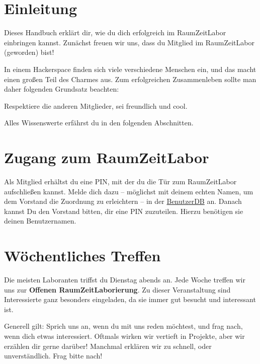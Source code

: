 \documentclass[12pt, DIV16, a4paper]{scrartcl}
\begin{document}
\pagestyle{fancy}
\newcommand{\np}{\bigskip\noindent}
\setlength{\parindent}{0pt}

\section*{Einleitung}

Dieses Handbuch erklärt dir, wie du dich erfolgreich im RaumZeitLabor
einbringen kannst. Zunächst freuen wir uns, dass du Mitglied im RaumZeitLabor
(geworden) bist!
\np

In einem Hackerspace finden sich viele verschiedene Menschen ein, und das macht
einen großen Teil des Charmes aus. Zum erfolgreichen Zusammenleben sollte man
daher folgenden Grundsatz beachten:

\begin{center}
	Respektiere die anderen Mitglieder, sei freundlich und cool.
\end{center}

Alles Wissenswerte erfährst du in den folgenden Abschnitten.

\section*{Zugang zum RaumZeitLabor}

Als Mitglied erhältst du eine PIN, mit der du die Tür zum RaumZeitLabor
aufschließen kannst. Melde dich dazu -- möglichst mit deinem echten Namen, um
dem Vorstand die Zuordnung zu erleichtern -- in der
\href{https://benutzerdb.raumzeitlabor.de/BenutzerDB/register}{BenutzerDB} an. Danach
kannst Du den Vorstand bitten, dir eine PIN zuzuteilen. Hierzu benötigen sie
deinen Benutzernamen.

\section*{Wöchentliches Treffen}

Die meisten Laboranten triffst du Dienstag abends an. Jede Woche treffen wir
uns zur \textbf{Offenen RaumZeitLaborierung}. Zu dieser Veranstaltung sind
Interessierte ganz besonders eingeladen, da sie immer gut besucht und
interessant ist.
\np

Generell gilt: Sprich uns an, wenn du mit uns reden möchtest, und frag nach,
wenn dich etwas interessiert. Oftmals wirken wir vertieft in Projekte, aber wir
erzählen dir gerne darüber! Manchmal erklären wir zu schnell, oder
unverständlich. Frag bitte nach!
\end{document}
